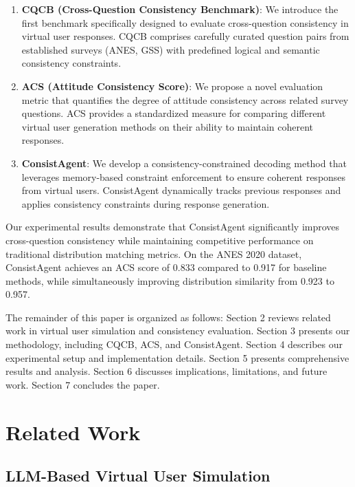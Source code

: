 \documentclass[sigconf, anonymous]{acmart}
\begin{document}
\begin{enumerate}
    \item \textbf{CQCB (Cross-Question Consistency Benchmark)}: We introduce the first benchmark specifically designed to evaluate cross-question consistency in virtual user responses. CQCB comprises carefully curated question pairs from established surveys (ANES, GSS) with predefined logical and semantic consistency constraints.
    
    \item \textbf{ACS (Attitude Consistency Score)}: We propose a novel evaluation metric that quantifies the degree of attitude consistency across related survey questions. ACS provides a standardized measure for comparing different virtual user generation methods on their ability to maintain coherent responses.
    
    \item \textbf{ConsistAgent}: We develop a consistency-constrained decoding method that leverages memory-based constraint enforcement to ensure coherent responses from virtual users. ConsistAgent dynamically tracks previous responses and applies consistency constraints during response generation.
\end{enumerate}

Our experimental results demonstrate that ConsistAgent significantly improves cross-question consistency while maintaining competitive performance on traditional distribution matching metrics. On the ANES 2020 dataset, ConsistAgent achieves an ACS score of 0.833 compared to 0.917 for baseline methods, while simultaneously improving distribution similarity from 0.923 to 0.957.

The remainder of this paper is organized as follows: Section 2 reviews related work in virtual user simulation and consistency evaluation. Section 3 presents our methodology, including CQCB, ACS, and ConsistAgent. Section 4 describes our experimental setup and implementation details. Section 5 presents comprehensive results and analysis. Section 6 discusses implications, limitations, and future work. Section 7 concludes the paper.

\section{Related Work}

\subsection{LLM-Based Virtual User Simulation}
\end{document}

